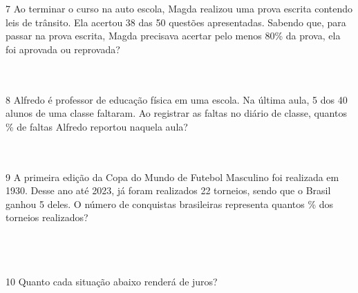 \num{7} Ao terminar o curso na auto escola, Magda realizou uma prova escrita
contendo leis de trânsito. Ela acertou 38 das 50 questões apresentadas.
Sabendo que, para passar na prova escrita, Magda precisava acertar pelo
menos 80\% da prova, ela foi aprovada ou reprovada?

\\
\\

\num{8} Alfredo é professor de educação física em uma escola. Na última aula,
5 dos 40 alunos de uma classe faltaram. Ao registrar as faltas no diário
de classe, quantos \% de faltas Alfredo reportou naquela aula?

\\
\\

\num{9} A primeira edição da Copa do Mundo de Futebol Masculino foi realizada
em 1930. Desse ano até 2023, já foram realizados 22 torneios, sendo que
o Brasil ganhou 5 deles. O número de conquistas brasileiras representa
quantos \% dos torneios realizados?

\\
\\
\\

\num{10} Quanto cada situação abaixo renderá de juros?
\\

\\
\\
\\
\\
\\

\\
\\
\\





